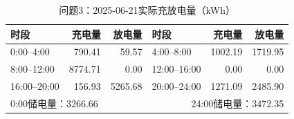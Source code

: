 \begin{table}[H]\centering\small
\caption{问题3：2025-06-21实际充放电量（kWh）}
\label{tab:q3_0621_storage}
\begin{tabular}{lrrlrr}\toprule
时段 & 充电量 & 放电量 & 时段 & 充电量 & 放电量\\\midrule
0:00--4:00 & 790.41 & 59.57 & 4:00--8:00 & 1002.19 & 1719.95 \\
8:00--12:00 & 8774.71 & 0.00 & 12:00--16:00 & 0.00 & 0.00 \\
16:00--20:00 & 156.93 & 5265.68 & 20:00--24:00 & 1271.09 & 2485.90 \\
\midrule\multicolumn{3}{l}{0:00储电量：3266.66} & \multicolumn{3}{r}{24:00储电量：3472.35}\\
\bottomrule\end{tabular}\end{table}
